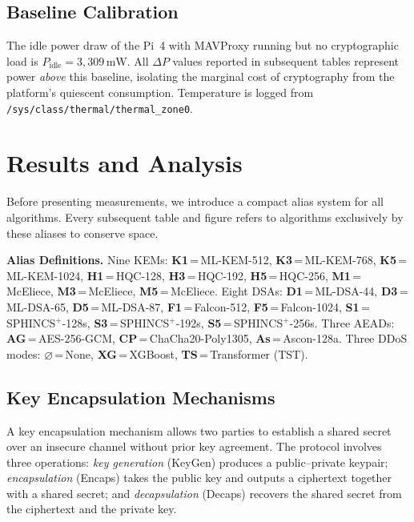 \documentclass[conference]{IEEEtran}
\begin{document}
\subsection{Baseline Calibration}
The idle power draw of the Pi~4 with MAVProxy running but no
cryptographic load is $P_{\text{idle}} = 3{,}309\,\text{mW}$.
All $\Delta P$ values reported in subsequent tables represent power
\emph{above} this baseline, isolating the marginal cost of
cryptography from the platform's quiescent consumption.  Temperature
is logged from \texttt{/sys/class/thermal/thermal\_zone0}.


\section{Results and Analysis}
\label{sec:results}

Before presenting measurements, we introduce a compact alias system
for all algorithms.  Every subsequent table and figure refers to
algorithms exclusively by these aliases to conserve space.

\smallskip\noindent\textbf{Alias Definitions.}
Nine KEMs: \textbf{K1}\,=\,ML-KEM-512,
\textbf{K3}\,=\,ML-KEM-768,
\textbf{K5}\,=\,ML-KEM-1024,
\textbf{H1}\,=\,HQC-128,
\textbf{H3}\,=\,HQC-192,
\textbf{H5}\,=\,HQC-256,
\textbf{M1}\,=\,McEliece,
\textbf{M3}\,=\,McEliece,
\textbf{M5}\,=\,McEliece.
Eight DSAs: \textbf{D1}\,=\,ML-DSA-44,
\textbf{D3}\,=\,ML-DSA-65,
\textbf{D5}\,=\,ML-DSA-87,
\textbf{F1}\,=\,Falcon-512,
\textbf{F5}\,=\,Falcon-1024,
\textbf{S1}\,=\,SPHINCS$^+$-128s,
\textbf{S3}\,=\,SPHINCS$^+$-192s,
\textbf{S5}\,=\,SPHINCS$^+$-256s.
Three AEADs: \textbf{AG}\,=\,AES-256-GCM,
\textbf{CP}\,=\,ChaCha20-Poly1305,
\textbf{As}\,=\,Ascon-128a.
Three DDoS modes: $\varnothing$\,=\,None,
\textbf{XG}\,=\,XGBoost,
\textbf{TS}\,=\,Transformer (TST).

\subsection{Key Encapsulation Mechanisms}
\label{sec:kem}

A key encapsulation mechanism allows two parties to establish a shared
secret over an insecure channel without prior key agreement.  The
protocol involves three operations: \emph{key generation}
(KeyGen) produces a public--private keypair; \emph{encapsulation}
(Encaps) takes the public key and outputs a ciphertext together with a
shared secret; and \emph{decapsulation} (Decaps) recovers the shared
secret from the ciphertext and the private key.
\end{document}
